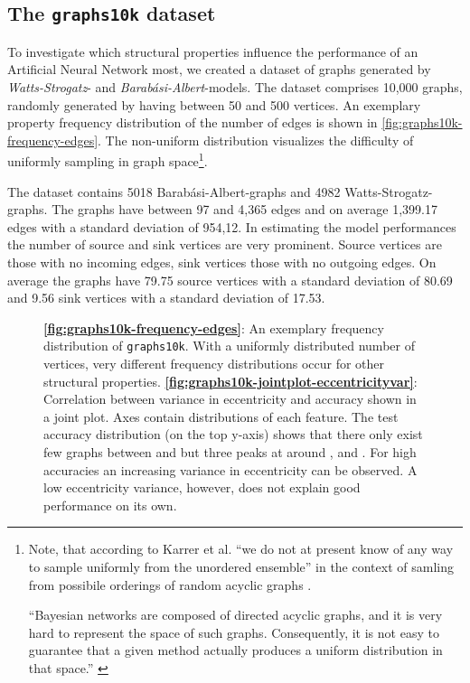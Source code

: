 \documentclass[runningheads]{llncs}
\newcommand{\imagePath}{./}
\begin{document}
\subsection{The \texttt{graphs10k} dataset}
To investigate which structural properties influence the performance of an Artificial Neural Network most, we created a dataset of graphs generated by \textit{Watts-Strogatz}- and \textit{Barabási-Albert}-models.
The dataset comprises 10,000 graphs, randomly generated by having between 50 and 500 vertices.
An exemplary property frequency distribution of the number of edges is shown in \autoref{fig:graphs10k-frequency-edges}.
The non-uniform distribution visualizes the difficulty of uniformly sampling in graph space\footnote{Note, that according to Karrer et al. ``we do not at present know of any way to sample uniformly from the unordered ensemble'' in the context of samling from possibile orderings of random acyclic graphs \cite{karrer2009random2}.

``Bayesian networks are composed of directed acyclic graphs, and it is very hard to represent the space of such graphs. Consequently, it is not easy to guarantee that a given method actually produces a uniform distribution in that space.'' \cite{ide2002random}}.

The dataset contains 5018 Barabási-Albert-graphs and 4982 Watts-Strogatz-graphs.
The graphs have between 97 and 4,365 edges and on average 1,399.17 edges with a standard deviation of 954,12.
In estimating the model performances the number of source and sink vertices are very prominent.
Source vertices are those with no incoming edges, sink vertices those with no outgoing edges.
On average the graphs have 79.75 source vertices with a standard deviation of 80.69 and 9.56 sink vertices with a standard deviation of 17.53.

\begin{figure}[tb]
	\hfill
	\caption{\textbf{\autoref{fig:graphs10k-frequency-edges}}: An exemplary frequency distribution of \texttt{graphs10k}.
		With a uniformly distributed number of vertices, very different frequency distributions occur for other structural properties.
		\textbf{\autoref{fig:graphs10k-jointplot-eccentricityvar}}: Correlation between variance in eccentricity and accuracy shown in a joint plot.
		Axes contain distributions of each feature.
		The test accuracy distribution (on the top y-axis) shows that there only exist few graphs between  and  but three peaks at around ,  and .
		For high accuracies an increasing variance in eccentricity can be observed.
		A low eccentricity variance, however, does not explain good performance on its own.}
\end{figure}
\end{document}
